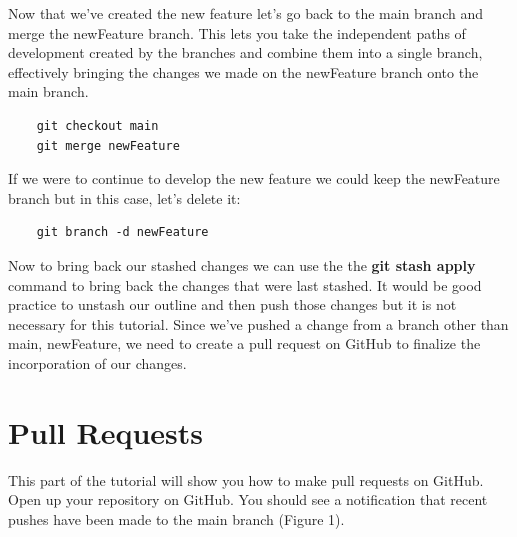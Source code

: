\documentclass{article}
\begin{document}
Now that we've created the new feature let's go back to the main branch and merge the newFeature branch. This lets you take the independent paths of development created by the branches and combine them into a single branch, effectively bringing the changes we made on the newFeature branch onto the main branch.

\begin{verbatim}
    git checkout main
    git merge newFeature
\end{verbatim}

If we were to continue to develop the new feature we could keep the newFeature branch but in this case, let's delete it:

\begin{verbatim}
    git branch -d newFeature
\end{verbatim}

Now to bring back our stashed changes we can use the the \textbf{git stash apply} command to bring back the changes that were last stashed. It would be good practice to unstash our outline and then push those changes but it is not necessary for this tutorial. Since we've pushed a change from a branch other than main, newFeature, we need to create a pull request on GitHub to finalize the incorporation of our changes.

\newpage
\section{Pull Requests}
This part of the tutorial will show you how to make pull requests on GitHub.
Open up your repository on GitHub. You should see a notification that recent pushes have been made to the main branch (Figure 1).
\end{document}
